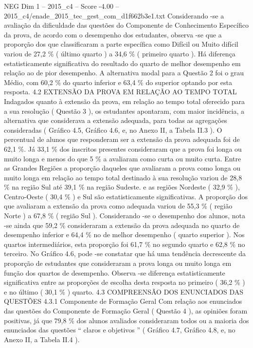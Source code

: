 \begin{textsample}{NEG Dim 1 – 2015\_c4 – Score -4.00 – 2015\_c4/enade\_2015\_tec\_gest\_com\_d1f662b3e1.txt}
Considerando -se a avaliação da dificuldade das questões do Componente de Conhecimento Específico da prova, de acordo com o desempenho dos estudantes, observa -se que a proporção dos que classificaram a parte específica como Difícil ou Muito difícil variou de 27,2 \% ( último quarto ) a 34,6 \% ( primeiro quarto ).
Há diferença estatisticamente significativa do resultado do quarto de melhor desempenho em relação ao de pior desempenho.
A alternativa modal para a Questão 2 foi o grau Médio, com 60,2 \% do quarto inferior e 63,4 \% do superior optando por esta resposta. 4.2 EXTENSÃO DA PROVA EM RELAÇÃO AO TEMPO TOTAL Indagados quanto à extensão da prova, em relação ao tempo total oferecido para a sua resolução ( Questão 3 ), os estudantes apontaram, com maior incidência, a alternativa que considerava a extensão adequada, para todas as agregações consideradas ( Gráfico 4.5, Gráfico 4.6, e, no Anexo II, a Tabela II.3 ).
O percentual de alunos que responderam ser a extensão da prova adequada foi de 62,1 \%.
Já 33,1 \% dos inscritos presentes consideraram que a prova foi longa ou muito longa e menos do que 5 \% a avaliaram como curta ou muito curta.
Entre as Grandes Regiões a proporção daqueles que avaliaram a prova como longa ou muito longa em relação ao tempo total destinado à sua resolução variou de 28,8 \% na região Sul até 39,1 \% na região Sudeste. e as regiões Nordeste ( 32,9 \% ), Centro-Oeste ( 30,4 \% ) e Sul são estatisticamente significativas.
A proporção dos que avaliaram a extensão da prova como adequada variou de 55,3 \% ( região Norte ) a 67,8 \% ( região Sul ).
Considerando -se o desempenho dos alunos, nota -se ainda que 59,2 \% consideraram a extensão da prova adequada no quarto de desempenho inferior e 64,4 \% no de melhor desempenho ( quarto superior ).
Nos quartos intermediários, esta proporção foi 61,7 \% no segundo quarto e 62,8 \% no terceiro.
No Gráfico 4.6, pode -se constatar que há uma tendência decrescente da proporção de estudantes que consideraram a prova longa ou muito longa em função dos quartos de desempenho.
Observa -se diferença estatisticamente significativa entre as proporções de escolha desta resposta no primeiro ( 36,2 \% ) e no último ( 30,1 \% ) quarto. 4.3 COMPREENSÃO DOS ENUNCIADOS DAS QUESTÕES 4.3.1 Componente de Formação Geral Com relação aos enunciados das questões do Componente de Formação Geral ( Questão 4 ), as opiniões foram positivas, já que 79,8 \% dos alunos avaliados consideraram todos ou a maioria dos enunciados das questões “ claros e objetivos ” ( Gráfico 4.7, Gráfico 4.8, e, no Anexo II, a Tabela II.4 ).

\end{textsample}
